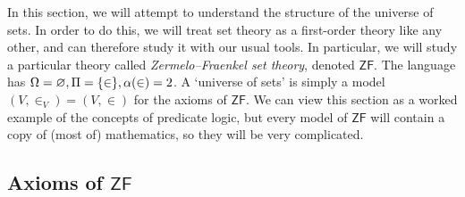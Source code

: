 In this section, we will attempt to understand the structure of the universe of sets.
In order to do this, we will treat set theory as a first-order theory like any other, and can therefore study it with our usual tools.
In particular, we will study a particular theory called \emph{Zermelo--Fraenkel set theory}, denoted \( \mathsf{ZF} \).
The language has \( \Omega = \varnothing, \Pi = \qty{\in}, \alpha(\in) = 2 \).
A `universe of sets' is simply a model \( (V, \in_V) = (V, \in) \) for the axioms of \( \mathsf{ZF} \).
We can view this section as a worked example of the concepts of predicate logic, but every model of \( \mathsf{ZF} \) will contain a copy of (most of) mathematics, so they will be very complicated.

\subsection{Axioms of \texorpdfstring{\(\mathsf{ZF}\)}{ZF}}

